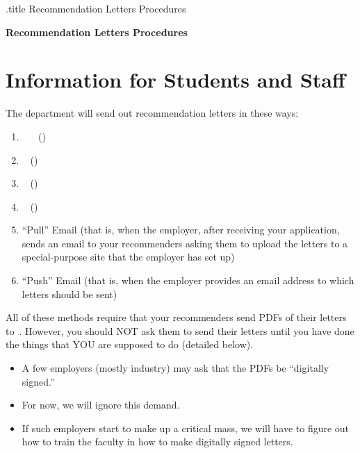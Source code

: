 \documentclass{\econtex}
\begin{document}
\renewcommand{\thepage}{} %


\begin{verbatimwrite}{\jobname.title}
  Recommendation Letters Procedures
\end{verbatimwrite}
\centerline{\textbf{{\Large Recommendation Letters Procedures}}}\medskip\medskip


\section{Information for Students and Staff}\hypertarget{students-and-staff}{}

The department will send out recommendation letters in these ways:
\begin{enumerate}
\item {\EJM}~ ~ (\EJMLink)
\item \AJO ~ (\AJOLink)
\item \AEA ~ (\AEALink)
\item \Interfolio ~ (\InterfolioLink)
\item ``Pull'' Email (that is, when the employer, after receiving your application, sends an email to your recommenders asking them to upload the letters to a special-purpose site that the employer has set up)
\item ``Push'' Email (that is, when the employer provides an email address to which letters should be sent)
\end{enumerate}

All of these methods require that your recommenders send PDFs of their letters 
to~\jmstaffemail.  However, you should NOT ask them to send their letters until you have done the things that YOU are supposed to do (detailed below).

\begin{itemize}
\item A few employers (mostly industry) may ask that the PDFs be ``digitally signed.''
\item For now, we will ignore this demand.
  \item If such employers start to make up a critical mass, we will have to figure out how to train the faculty in how to make digitally signed letters.
\end{itemize}
\end{document}
